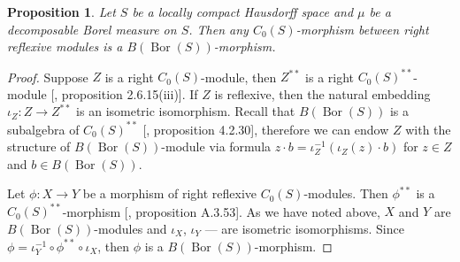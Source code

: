 \documentclass[12pt]{article}
\newtheorem{proposition}[theorem]{Proposition}
\begin{document}
\begin{proposition}\label{C0SMorphBtwnReflxSpIsBMorph}
    Let $S$ be a locally compact Hausdorff space and $\mu$ be a decomposable 
    Borel measure on $S$. Then any $C_0(S)$-morphism between 
    right reflexive modules is a $B(\operatorname{Bor}(S))$-morphism. 
\end{proposition}
\begin{proof} 
    Suppose $Z$ is a right $C_0(S)$-module, then $Z^{**}$ is a 
    right $C_0(S)^{**}$-module 
    [\cite{DalBanAlgAutCont}, proposition 2.6.15(iii)]. If $Z$ is reflexive, 
    then the natural embedding $\iota_Z:Z\to Z^{**}$ is an isometric 
    isomorphism. Recall that $B(\operatorname{Bor}(S))$ is a subalgebra 
    of $C_0(S)^{**}$ [\cite{DalBanAlgAutCont}, proposition 4.2.30], 
    therefore we can endow $Z$ with the structure 
    of $B(\operatorname{Bor}(S))$-module via 
    formula $z\cdot b=\iota_Z^{-1}(\iota_Z(z)\cdot b)$ for $z\in Z$ 
    and $b\in B(\operatorname{Bor}(S))$.
    
    Let $\phi:X\to Y$ be a morphism of right reflexive $C_0(S)$-modules. 
    Then $\phi^{**}$ is a $C_0(S)^{**}$-morphism
    [\cite{DalBanAlgAutCont}, proposition A.3.53]. As we have noted above, $X$
    and $Y$ are $B(\operatorname{Bor}(S))$-modules 
    and $\iota_X$, $\iota_Y$ --- are isometric isomorphisms. 
    Since $\phi=\iota_Y^{-1}\circ \phi^{**}\circ \iota_X$, then $\phi$ is 
    a $B(\operatorname{Bor}(S))$-morphism.
\end{proof}
\end{document}
